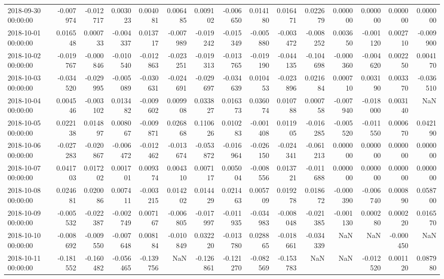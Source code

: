 \begin{tabular}{lrrrrrrrrrrrrrr}
2018-09-30 00:00:00 & -0.007974 & -0.012717 & 0.003023 & 0.004081 & 0.006485 & 0.009102 & -0.006650 & 0.014180 & 0.016471 & 0.022679 & 0.000000 & 0.000000 & 0.000000 & 0.000000 \\
2018-10-01 00:00:00 & 0.016548 & 0.000733 & -0.004337 & 0.013717 & -0.007989 & -0.019242 & -0.015349 & -0.005880 & -0.003472 & -0.008252 & 0.003650 & -0.001120 & 0.002710 & -0.009900 \\
2018-10-02 00:00:00 & -0.019767 & -0.000846 & -0.010540 & -0.012863 & -0.023251 & -0.019313 & -0.013765 & -0.019190 & -0.044135 & -0.104698 & -0.000360 & -0.004620 & 0.002250 & 0.004170 \\
2018-10-03 00:00:00 & -0.034520 & -0.029995 & -0.005089 & -0.030631 & -0.024691 & -0.029697 & -0.034639 & 0.010453 & -0.023896 & 0.021684 & 0.000710 & 0.003190 & 0.003370 & -0.036510 \\
2018-10-04 00:00:00 & 0.004546 & -0.003102 & 0.013482 & -0.009602 & 0.009908 & 0.033827 & 0.016373 & 0.036074 & 0.010788 & 0.000758 & -0.007940 & -0.018000 & 0.003140 & NaN \\
2018-10-05 00:00:00 & 0.022138 & 0.014897 & 0.008067 & -0.009871 & 0.026868 & 0.110626 & 0.010283 & -0.001408 & 0.011905 & -0.016285 & -0.005520 & -0.011550 & 0.000670 & 0.042190 \\
2018-10-06 00:00:00 & -0.027283 & -0.020867 & -0.006472 & -0.012462 & -0.013674 & -0.053872 & -0.016964 & -0.026150 & -0.024341 & -0.061213 & 0.000000 & 0.000000 & 0.000000 & 0.000000 \\
2018-10-07 00:00:00 & 0.041703 & 0.017202 & 0.001701 & 0.009374 & 0.004310 & 0.007117 & 0.005004 & -0.008556 & 0.013721 & -0.011688 & 0.000000 & 0.000000 & 0.000000 & 0.000000 \\
2018-10-08 00:00:00 & 0.024681 & 0.020086 & 0.007411 & -0.003215 & 0.014202 & 0.014429 & 0.021463 & 0.005709 & 0.019278 & 0.018672 & -0.000390 & -0.006740 & 0.000890 & 0.058700 \\
2018-10-09 00:00:00 & -0.005532 & -0.022387 & -0.002749 & 0.007167 & -0.006805 & -0.017997 & -0.011935 & -0.034983 & -0.008048 & -0.021385 & -0.001130 & 0.000280 & 0.000220 & 0.016570 \\
2018-10-10 00:00:00 & -0.008692 & -0.009550 & -0.007648 & 0.008184 & -0.010849 & 0.032220 & -0.013780 & 0.028865 & -0.018661 & -0.034339 & NaN & NaN & -0.000450 & NaN \\
2018-10-11 00:00:00 & -0.181552 & -0.160482 & -0.056465 & -0.139756 & NaN & -0.126861 & -0.121270 & -0.082569 & -0.153783 & NaN & NaN & -0.012520 & 0.001120 & 0.087980 \\

\end{tabular}
